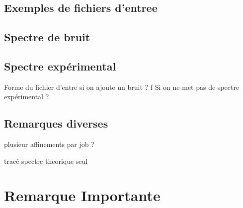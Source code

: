 \documentclass[a4paper]{article}
\begin{document}
\subsection{Exemples de fichiers d'entree}
\subsection{Spectre de bruit}
\subsection{Spectre expérimental}
Forme du fichier d'entre si on ajoute un bruit ?
f
Si on ne met pas de spectre expérimental ?
\subsection{Remarques diverses}
plusieur affinements par job ?

tracé spectre theorique seul

\section{Remarque Importante}
\end{document}
